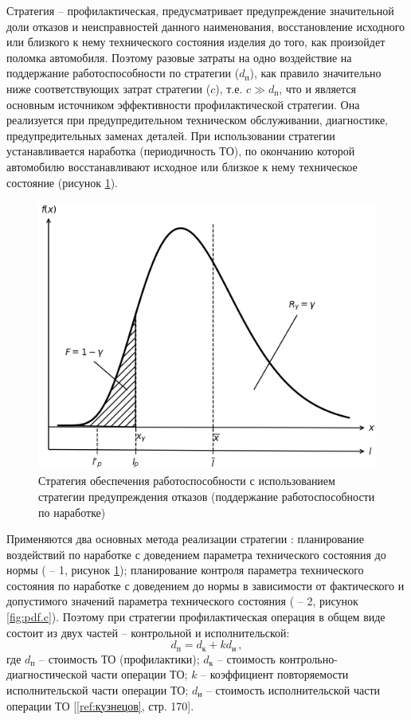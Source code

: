 \documentclass[../nirs.tex]{subfiles}
\begin{document}
Стратегия  -- профилактическая, предусматривает предупреждение
значительной доли отказов и неисправностей данного наименования, восстановление
исходного или близкого к нему технического состояния изделия до того, как
произойдет поломка автомобиля. Поэтому разовые затраты на одно воздействие на
поддержание работоспособности по стратегии  ($d_{\text{п}}$), как
правило значительно ниже соответствующих затрат стратегии  ($c$), т.е.
$c \gg d_{\text{п}}$, что и является основным источником эффективности
профилактической стратегии. Она реализуется при предупредительном техническом
обслуживании, диагностике, предупредительных заменах деталей. При использовании
стратегии  устанавливается наработка (периодичность ТО), по окончанию
которой автомобилю восстанавливают исходное или близкое к нему техническое
состояние (рисунок \ref{fig:pdf.b}).

\begin{figure}[H]
\centering
\includegraphics[keepaspectratio,width=\textwidth]{./images/pdf.b.png}
    \caption{Стратегия обеспечения работоспособности с использованием стратегии
    предупреждения отказов (поддержание работоспособности по наработке)}
\label{fig:pdf.b}
\end{figure}

Применяются два основных метода реализации стратегии : планирование
воздействий по наработке с доведением параметра технического состояния до нормы
( -- 1, рисунок \ref{fig:pdf.b}); планирование контроля параметра
технического состояния по наработке с доведением до нормы в зависимости от
фактического и допустимого значений параметра технического состояния ( --
2, рисунок \ref{fig:pdf.c}). Поэтому при стратегии  профилактическая
операция в общем виде состоит из двух частей -- контрольной и исполнительской:
\begin{equation*}
    d_{\text{п}} = d_{\text{к}} + k d_{\text{и}}\,,
\end{equation*}
где $d_{\text{п}}$ -- стоимость ТО (профилактики); $d_{\text{к}}$ -- стоимость
контрольно-диагностической части операции ТО; $k$ -- коэффициент повторяемости
исполнительской части операции ТО; $d_{\text{и}}$ -- стоимость исполнительской
части операции ТО [\ref{ref:кузнецов}, стр. 170].
\end{document}

